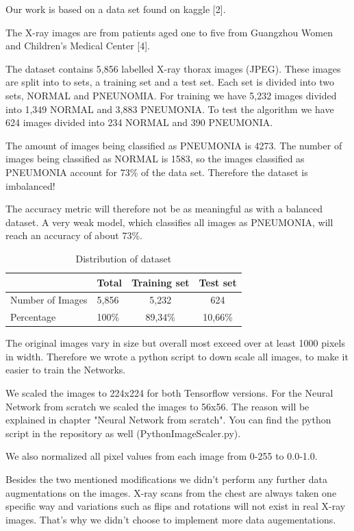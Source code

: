 \documentclass{article}
\begin{document}
Our work is based on a data set found on kaggle [2].

The X-ray images are from patients aged one to five from Guangzhou Women and Children's Medical Center [4]. 

The dataset contains 5,856 labelled X-ray thorax images (JPEG). These images are split into to sets, 
a training set and a test set. Each set is divided into two sets, NORMAL and PNEUNOMIA. 
For training we have 5,232 images divided into 1,349 NORMAL and 3,883 PNEUMONIA. 
To test the algorithm we have 624 images divided into 234 NORMAL and 390 PNEUMONIA. 

The amount of images being classified as PNEUMONIA is 4273. 
The number of images being classified as NORMAL is 1583, 
so the images classified as PNEUMONIA account for 73\% of the data set. 
Therefore the dataset is imbalanced!

The accuracy metric will therefore not be as meaningful as with a balanced dataset.
A very weak model, which classifies all images as PNEUMONIA, will reach an accuracy of about 73\%.

\begin{table}[h]
	\centering
	\begin{tabular}{|l|l|c|c|}
	\hline
	& Total & Training set & Test set \\ \hline \hline
  Number of Images & 5,856 & 5,232    & 624 \\ \hline
  Percentage       & 100\% & 89,34\%  & 10,66\% \\ \hline
	\end{tabular}
	\caption{Distribution of dataset}
	\label{tab:distribution_of_dataset}
\end{table}

The original images vary in size but overall most exceed over at least 1000 pixels in width. 
Therefore we wrote a python script to down scale all images, to make it easier to train the Networks.

We scaled the images to 224x224 for both Tensorflow versions. 
For the Neural Network from scratch we scaled the images to 56x56. 
The reason will be explained in chapter "Neural Network from scratch".
You can find the python script in the repository as well (PythonImageScaler.py).

We also normalized all pixel values from each image from 0-255 to 0.0-1.0.

Besides the two mentioned modifications we didn't perform any further data augmentations on the images. 
X-ray scans from the chest are always taken one specific way and variations such as flips and rotations will 
not exist in real X-ray images. That's why we didn't choose to implement more data augementations.
\end{document}
